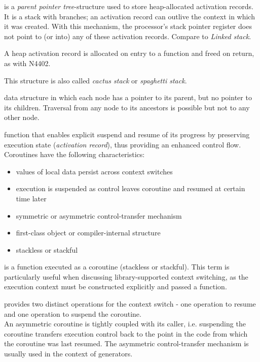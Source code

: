 is a \emph{parent pointer tree}-structure used to store heap-allocated
activation records. It is a stack with branches; an activation record can
outlive the context in which it was created. With this mechanism, the
processor's stack pointer register does not point to (or into) any of these
activation records. Compare to \emph{Linked stack}.

A heap activation record is allocated on entry to a function and freed on
return, as with N4402\cite{N4402}.

This structure is also called \emph{cactus stack}\cite{cactusstack}
or \emph{spaghetti stack}.

data structure in which each node has a pointer to its parent, but no pointer to
its children. Traversal from any node to its ancestors is possible but not to
any other node.

function that enables explicit suspend and resume of its progress by
preserving execution state (\emph{activation record}), thus providing an
enhanced control flow. Coroutines have the following characteristics\cite{N3985}:
\begin{itemize}
    \item values of local data persist across context switches
    \item execution is suspended as control leaves coroutine and resumed at
          certain time later
    \item symmetric or asymmetric control-transfer mechanism
    \item first-class object or compiler-internal structure
    \item stackless or stackful
\end{itemize}

is a function executed as a coroutine (stackless or stackful). This term is
particularly useful when discussing library-supported context switching, as
the execution context must be constructed explicitly and passed a function.

provides two distinct operations for the context switch - one operation to
resume and one operation to suspend the coroutine.\\
An asymmetric coroutine is tightly coupled with its caller, i.e. suspending
the coroutine transfers execution control back to the point in the code
from which the coroutine was last resumed. The asymmetric control-transfer
mechanism is usually used in the context of generators.

